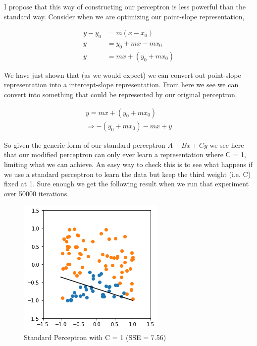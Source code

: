 \documentclass{article}
\begin{document}
I propose that this way of constructing our perceptron is less powerful than the standard way. Consider when we are optimizing our point-slope representation, 

\begin{align*}
y - y_0 &= m(x - x_0) \\
y &= y_0 + mx - mx_0 \\
y &= mx + (y_0 + mx_0)
\end{align*}

We have just shown that (as we would expect) we can convert out point-slope representation into a intercept-slope representation. From here we see we can convert into something that could be represented by our original perceptron.

\begin{align*}
y = mx + (y_0 + mx_0)\\
\Rightarrow -(y_0 + mx_0) -mx + y
\end{align*}

So given the generic form of our standard perceptron $A + Bx + Cy$ we see here that our modified perceptron can only ever learn a representation where C = 1, limiting what we can achieve. An easy way to check this is to see what happens if we use a standard perceptron to learn the data but keep the third weight (i.e. C) fixed at 1. Sure enough we get the following result when we run that experiment over 50000 iterations.

\begin{figure}[H]
\centering
  \begin{minipage}[b]{0.4\textwidth}
    \includegraphics[width=\textwidth]{Standard-Perceptron-(C=1).png}
    \caption{Standard Perceptron with C = 1 (SSE = 7.56)}
  \end{minipage}
  \hfill
\end{figure}
\end{document}

